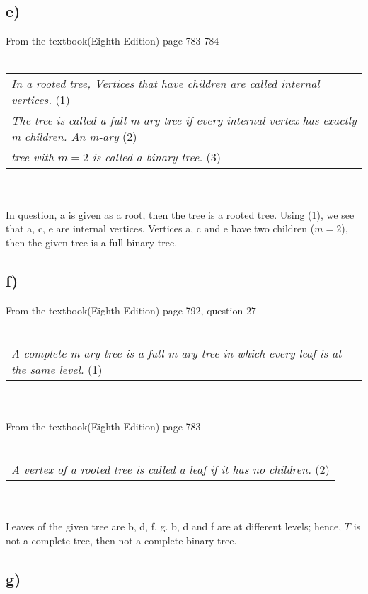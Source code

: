 \documentclass[11pt]{article}
\begin{document}
\subsection*{e)}
From the textbook(Eighth Edition) page 783-784
\\ \\
\begin{tabular}{l}
    \textit{In a rooted tree, Vertices that have children are called internal vertices.} (1)\\
    \textit{The tree is called a full m-ary tree if every internal vertex has exactly m children. An m-ary} (2)\\
    \textit{tree with $m = 2$ is called a binary tree.} (3)     
\end{tabular}
\\ \\
In question, a is given as a root, then the tree is a rooted tree. 
Using (1), we see that a, c, e are internal vertices. Vertices a, c and e have two children ($m=2$), then 
the given tree is a full binary tree.
\subsection*{f)}
From the textbook(Eighth Edition) page 792, question $27$
\\ \\
\begin{tabular}{l}
    \textit{A complete m-ary tree is a full m-ary tree in which every leaf is at the same level.} (1)\\
\end{tabular}
\\ \\
From the textbook(Eighth Edition) page 783
\\ \\
\begin{tabular}{l}
    \textit{A vertex of a rooted tree is called a leaf if it has no children.} (2)\\
\end{tabular}
\\ \\
Leaves of the given tree are b, d, f, g. b, d and f are at different levels; hence, $T$ is not a
complete tree, then not a complete binary tree.
\subsection*{g)}
\end{document}
